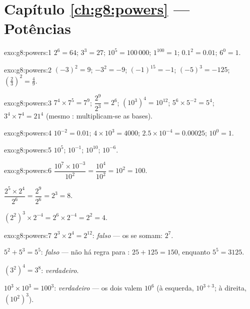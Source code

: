 \section*{Capítulo \ref{ch:g8:powers} --- Potências}

\begin{solution}{exo:g8:powers:1}
$2^6 = 64$; \quad $3^3 = 27$; \quad $10^5 = 100\,000$; \quad
$1^{100} = 1$; \quad $0.1^2 = 0.01$; \quad $6^0 = 1$.
\end{solution}

\begin{solution}{exo:g8:powers:2}
$(-3)^2 = 9$; \quad $-3^2 = -9$; \quad $(-1)^{15} = -1$; \quad
$(-5)^3 = -125$; \quad $\left(\frac23\right)^2 = \frac49$.
\end{solution}

\begin{solution}{exo:g8:powers:3}
$7^4 \times 7^5 = 7^9$; \quad
$\dfrac{2^9}{2^3} = 2^6$; \quad
$\left(10^3\right)^4 = 10^{12}$; \quad
$5^6 \times 5^{-2} = 5^4$; \quad
$3^4 \times 7^4 = 21^4$ (mesmo : multiplicam-se as bases).
\end{solution}

\begin{solution}{exo:g8:powers:4}
$10^{-2} = 0.01$; \quad
$4 \times 10^3 = 4000$; \quad
$2.5 \times 10^{-4} = 0.00025$; \quad
$10^0 = 1$.
\end{solution}

\begin{solution}{exo:g8:powers:5}
$10^5$; \quad $10^{-1}$; \quad $10^{10}$; \quad $10^{-6}$.
\end{solution}

\begin{solution}{exo:g8:powers:6}
$\dfrac{10^7 \times 10^{-3}}{10^2} = \dfrac{10^4}{10^2} = 10^2 =
100$.

$\dfrac{2^5 \times 2^4}{2^6} = \dfrac{2^9}{2^6} = 2^3 = 8$.

$\left(2^2\right)^3 \times 2^{-4} = 2^6 \times 2^{-4} = 2^2 = 4$.
\end{solution}

\begin{solution}{exo:g8:powers:7}
$2^3 \times 2^4 = 2^{12}$: \emph{falso} --- os  se somam:
$2^7$.

$5^2 + 5^3 = 5^5$: \emph{falso} --- não há regra para :
$25 + 125 = 150$, enquanto $5^5 = 3125$.

$(3^2)^4 = 3^8$: \emph{verdadeiro}.

$10^3 \times 10^3 = 100^3$: \emph{verdadeiro} --- os dois valem $10^6$
(à esquerda, $10^{3+3}$; à direita, $(10^2)^3$).
\end{solution}

